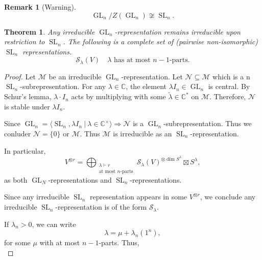 \documentclass[10pt]{article}
\newtheorem{theorem}{Theorem} [section]
\newtheorem{remark}{Remark}[section]
\numberwithin{equation}{theorem}
\DeclareMathOperator{\GL}{GL}
\DeclareMathOperator{\SL}{SL}
\newcommand{\C}[0]{\mathbb{C}}
\newcommand{\sep}[0]{\:|\:}
\begin{document}
\begin{remark}[Warning]
  \begin{equation*}
    \GL_n/Z(\GL_n)\not\cong \SL_n.
  \end{equation*}
\end{remark}
\begin{theorem}
  \label{theorem_4_14}
  Any irreducible $\GL_n$-representation remains irreducible upon restriction to $\SL_n$. The following is a complete set of (pairwise non-isomorphic) $\SL_n$ representations.
  \begin{equation*}
    \mathcal{S}_\lambda(V)\quad\text{$\lambda$ has at most $n-1$-parts}.
  \end{equation*}
\end{theorem}
\begin{proof}
  Let $\mathcal{M}$ be an irreducible $\GL_n$-representation. Let $\mathcal{N}\subseteq\mathcal{M}$ which is a n $\SL_n$-subrepresentation. For any $\lambda\in\C$, the element $\lambda I_n\in\GL_n$ is central.
  By Schur's lemma, $\lambda\cdot I_n$ acts by multiplying with some $\tilde{\lambda}\in\C^*$ on $\mathcal{M}$. Therefore, $\mathcal{N}$ is stable under $\lambda I_n$. \\
  \par Since $\GL_n=\langle \SL_n,\lambda I_n\sep \lambda\in\C^\times\rangle\Rightarrow\mathcal{N}$ is a $\GL_n$-subrepresentation. Thus we conluder $\mathcal{N}=\{0\}$ or $\mathcal{M}$. Thus $\mathcal{M}$ is irreducible as an $\SL_n$-representation.
  \par In particular, 
  \begin{equation*}
    V^{\otimes r} = \bigoplus_{\substack{\lambda\vdash r\\ {\text{at most $n$-parts}}}}\mathcal{S}_\lambda(V)^{\otimes \dim S^\lambda}\boxtimes S^\lambda,
  \end{equation*}
  as both $\GL_N$-representations and $\SL_n$-representations.\\
  \par Since any irreducible $\SL_n$ representation appears in some $V^{\otimes r}$, we conclude any irreducible $\SL_n$-representation is of the form $\mathcal{S}_\lambda$.\\
  \par If $\lambda_n>0$, we can write 
  \begin{equation*}
    \lambda = \mu +\lambda_n(1^n),
  \end{equation*}
  for some $\mu$ with at most $n-1$-parts. Thus,
  \begin{equation*}

\end{equation*}
\end{proof}
\end{document}
